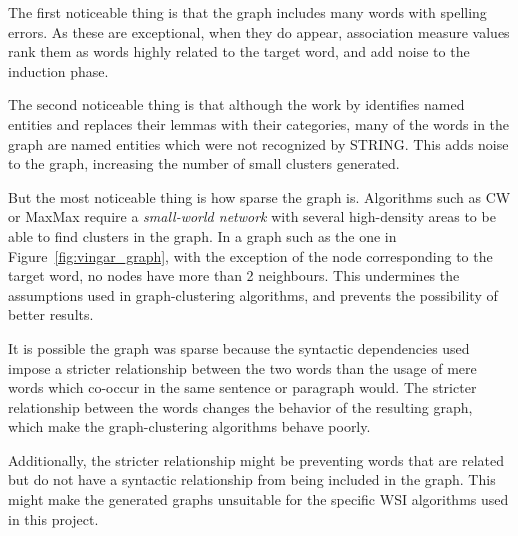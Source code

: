 The first noticeable thing is that the graph includes many words with spelling
errors. As these are exceptional, when they do appear, association measure
values rank them as words highly related to the target word, and add noise to
the induction phase.

The second noticeable thing is that although the work by
\citet{correia2015syntax} identifies named entities and replaces their lemmas
with their categories, many of the words in the graph are named entities which
were not recognized by \ac{STRING}. This adds noise to the graph, increasing the
number of small clusters generated.

But the most noticeable thing is how sparse the graph is. Algorithms such as
\ac{CW} or MaxMax require a \emph{small-world network} with several high-density
areas to be able to find clusters in the graph. In a graph such as the one
in Figure~\ref{fig:vingar_graph}, with the exception of the node corresponding
to the target word, no nodes have more than 2 neighbours. This undermines the
assumptions used in graph-clustering algorithms, and prevents the possibility
of better results.

It is possible the graph was sparse because the syntactic dependencies used
impose a stricter relationship between the two words than the usage of mere
words which co-occur in the same sentence or paragraph would. The stricter
relationship between the words changes the behavior of the resulting graph,
which make the graph-clustering algorithms behave poorly.

Additionally, the stricter relationship might be preventing words that are
related but do not have a syntactic relationship from being included in the
graph. This might make the generated graphs unsuitable for the specific \ac{WSI}
algorithms used in this project.

